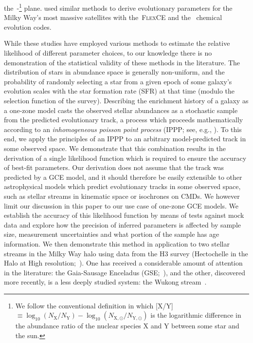 \documentclass[ms.tex]{subfiles}
\begin{document}
the~\afe-\feh\footnote{
	We follow the conventional definition in which
	[X/Y]~$\equiv \log_{10}(N_\text{X} / N_\text{Y}) -
	\log_{10}(N_{\text{X},\odot} / N_{\text{Y},\odot})$
	is the logarithmic difference in the abundance ratio of the nuclear species
	X and Y between some star and the sun.
} plane.
\citet{Hasselquist2021} used similar methods to derive evolutionary parameters
for the Milky Way's most massive satellites with the~\textsc{FlexCE}
\citep{Andrews2017} and the~\citet{Lian2018, Lian2020} chemical evolution
codes.
\par
While these studies have employed various methods to estimate the relative
likelihood of different parameter choices, to our knowledge there is no
demonstration of the statistical validity of these methods in the literature.
The distribution of stars in abundance space is generally non-uniform, and the
probability of randomly selecting a star from a given epoch of some galaxy's
evolution scales with the star formation rate (SFR) at that time (modulo the
selection function of the survey).
Describing the enrichment history of a galaxy as a one-zone model casts the
observed stellar abundances as a stochastic sample from the predicted
evolutionary track, a process which proceeds mathematically according to an
\textit{inhomogeneous poisson point process} (IPPP; see, e.g.,
\citealt{Press2007}).
To this end, we apply the principles of an IPPP to an arbitrary model-predicted
track in some observed space.
We demonstrate that this combination results in the derivation of a single
likelihood function which is required to ensure the accuracy of best-fit
parameters.
Our derivation does not assume that the track was predicted by a GCE model,
and it should therefore be easily extensible to other astrophysical models
which predict evolutionary tracks in some observed space, such as stellar
streams in kinematic space or isochrones on CMDs.
We however limit our discussion in this paper to our use case of one-zone GCE
models.
We establish the accuracy of this likelihood function by means of tests
against mock data and explore how the precision of inferred parameters is
affected by sample size, measurement uncertainties and what portion of the
sample has age information.
We then demonstrate this method in application to two stellar streams in the
Milky Way halo using data from the H3 survey (Hectochelle in the Halo at High
resolution;~\citealp{Conroy2019}).
One has received a considerable amount of attention in the literature: the
Gaia-Sausage Enceladus (GSE;~\citealp{Belokurov2018, Helmi2018}), and the
other, discovered more recently, is a less deeply studied system: the Wukong
stream~\citep{Naidu2020, Naidu2022}.
\end{document}
